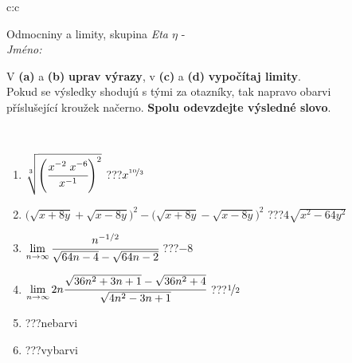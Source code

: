 \documentclass[10pt]{report}
\begin{document}
\newpage
\thispagestyle{empty}
\begin{tabular}{c:c}
\begin{minipage}[c][104.5mm][t]{0.5\linewidth}
\begin{center}
\vspace{7mm}
{\huge Odmocniny a limity, skupina \textit{Eta $\eta$} -}\\[5mm]
\textit{Jméno:}\phantom{xxxxxxxxxxxxxxxxxxxxxxxxxxxxxxxxxxxxxxxxxxxxxxxxxxxxxxxxxxxxxxxxx}\\[5mm]
\begin{minipage}{0.95\linewidth}
\begin{center}
V \textbf{(a)} a \textbf{(b)} \textbf{uprav výrazy}, v \textbf{(c)} a \textbf{(d)} \textbf{vypočítaj limity}.\\Pokud se výsledky shodujú s tými za otazníky, tak napravo obarvi\\příslušející kroužek načerno. \textbf{Spolu odevzdejte výsledné slovo}.
\end{center}
\end{minipage}
\\[1mm]
\begin{minipage}{0.79\linewidth}
\begin{center}
\begin{varwidth}{\linewidth}
\begin{enumerate}
\small
\item $\sqrt[3]{\left(\cfrac{x^{-2}\;x^{-6}}{x^{-1}}\right)^{2}}$\quad \dotfill\; ???\;\dotfill \quad $x^{\nicefrac{10}{3}}$
\item {\footnotesize{\scriptsize$\big(\sqrt{x+8y}+\sqrt{x-8y}\big)^2-\big(\sqrt{x+8y}-\sqrt{x-8y}\big)^2$}\quad \dotfill\; ???\;\dotfill \quad $4\sqrt{x^2-64y^2}$}
\item $\lim\limits_{n\to\infty}\cfrac{n^{-1/2}}{\sqrt{64n-4}-\sqrt{64n-2}}$\quad \dotfill\; ???\;\dotfill \quad $-8$
\item $\lim\limits_{n\to\infty}2n\cfrac{\sqrt{36n^2+3n+1}-\sqrt{36n^2+4}}{\sqrt{4n^2-3n+1}}$\quad \dotfill\; ???\;\dotfill \quad $\nicefrac{1}{2}$
\item \quad \dotfill\; ???\;\dotfill \quad nebarvi
\item \quad \dotfill\; ???\;\dotfill \quad vybarvi
\end{enumerate}
\end{varwidth}
\end{center}
\end{minipage}
\begin{minipage}{0.20\linewidth}

\end{minipage}
\end{center}
\end{minipage}
\end{tabular}
\end{document}
